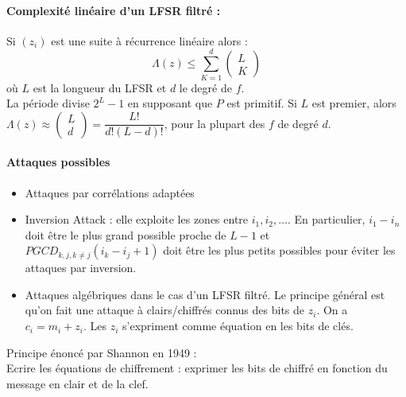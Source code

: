 \documentclass[12pt,a4paper]{report}
\begin{document}
\paragraph{Complexité linéaire d'un LFSR filtré : \\}
Si $(z_i)$ est une suite à récurrence linéaire alors :
$$ \Lambda(z) \leqslant \sum_{K=1}^d \left(\begin{array}{c} L \\ K \end{array} \right) $$
où $L$ est la longueur du LFSR et $d$ le degré de $f$.\\
La période divise $2^L-1$ en supposant que $P$ est primitif. Si $L$ est premier, alors $\Lambda(z) \approx \left(\begin{array}{c} L \\ d \end{array} \right) = \dfrac{L!}{d!(L-d)!}$, pour la plupart des $f$ de degré $d$.
\paragraph{Attaques possibles \\}
\begin{itemize}
\item Attaques par corrélations adaptées
\item Inversion Attack : elle exploite les zones entre $i_1,i_2,\ldots$. En particulier, $i_1-i_n$ doit être le plus grand possible proche de $L-1$ et $PGCD_{k,j,k\neq j}(i_k-i_j+1)$ doit être les plus petits possibles pour éviter les attaques par inversion.
\item Attaques algébriques dans le cas d'un LFSR filtré. Le principe général est qu'on fait une attaque à clairs/chiffrés connus des bits de $z_i$. On a $c_i = m_i+z_i$. Les $z_i$ s'expriment comme équation en les bits de clés.
\end{itemize}

Principe énoncé par Shannon en 1949 :\\
Ecrire les équations de chiffrement : exprimer les bits de chiffré en fonction du message en clair et de la clef.\\

\begin{figure}[h!]
	\centering
  \scalebox{0.65}{}	
\end{figure}
\end{document}
